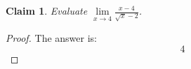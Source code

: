 \documentclass{article}
\newtheorem{theorem}{Claim}
\begin{document}
\begin{theorem}
Evaluate $\lim\limits_{x\to 4}\frac{x-4}{\sqrt{x}-2}$.
\end{theorem}

\begin{proof}
The answer is:
\[
4
\]
\end{proof}
\end{document}
